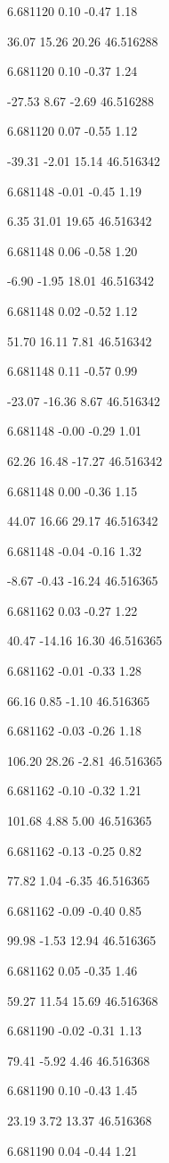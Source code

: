 6.681120
0.10
-0.47
1.18

36.07
15.26
20.26
46.516288

6.681120
0.10
-0.37
1.24

-27.53
8.67
-2.69
46.516288

6.681120
0.07
-0.55
1.12

-39.31
-2.01
15.14
46.516342

6.681148
-0.01
-0.45
1.19

6.35
31.01
19.65
46.516342

6.681148
0.06
-0.58
1.20

-6.90
-1.95
18.01
46.516342

6.681148
0.02
-0.52
1.12

51.70
16.11
7.81
46.516342

6.681148
0.11
-0.57
0.99

-23.07
-16.36
8.67
46.516342

6.681148
-0.00
-0.29
1.01

62.26
16.48
-17.27
46.516342

6.681148
0.00
-0.36
1.15

44.07
16.66
29.17
46.516342

6.681148
-0.04
-0.16
1.32

-8.67
-0.43
-16.24
46.516365

6.681162
0.03
-0.27
1.22

40.47
-14.16
16.30
46.516365

6.681162
-0.01
-0.33
1.28

66.16
0.85
-1.10
46.516365

6.681162
-0.03
-0.26
1.18

106.20
28.26
-2.81
46.516365

6.681162
-0.10
-0.32
1.21

101.68
4.88
5.00
46.516365

6.681162
-0.13
-0.25
0.82

77.82
1.04
-6.35
46.516365

6.681162
-0.09
-0.40
0.85

99.98
-1.53
12.94
46.516365

6.681162
0.05
-0.35
1.46

59.27
11.54
15.69
46.516368

6.681190
-0.02
-0.31
1.13

79.41
-5.92
4.46
46.516368

6.681190
0.10
-0.43
1.45

23.19
3.72
13.37
46.516368

6.681190
0.04
-0.44
1.21

